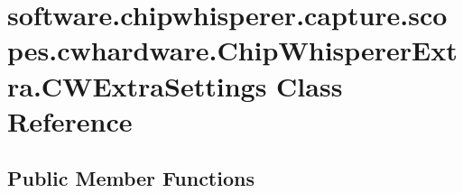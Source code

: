 \hypertarget{classsoftware_1_1chipwhisperer_1_1capture_1_1scopes_1_1cwhardware_1_1ChipWhispererExtra_1_1CWExtraSettings}{}\section{software.\+chipwhisperer.\+capture.\+scopes.\+cwhardware.\+Chip\+Whisperer\+Extra.\+C\+W\+Extra\+Settings Class Reference}
\label{classsoftware_1_1chipwhisperer_1_1capture_1_1scopes_1_1cwhardware_1_1ChipWhispererExtra_1_1CWExtraSettings}
\subsection*{Public Member Functions}
